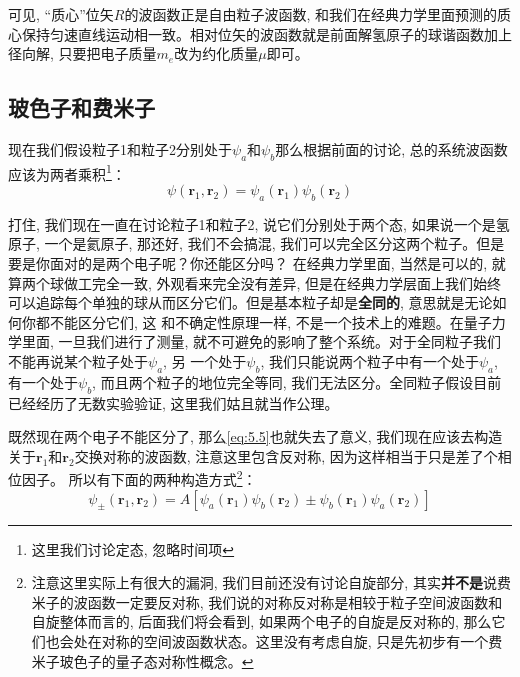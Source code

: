 可见, “质心”位矢$R$的波函数正是自由粒子波函数, 和我们在经典力学里面预测的质心保持匀速直线运动相一致。相对位矢的波函数就是前面解氢原子的球谐函数加上径向解, 只要把电子质量$m_e$改为约化质量$\mu$即可。
\subsection{玻色子和费米子}
现在我们假设粒子1和粒子2分别处于$\psi_a$和$\psi_b$那么根据前面的讨论, 总的系统波函数应该为两者乘积\footnote{这里我们讨论定态, 忽略时间项}：
\begin{equation}
    \label{eq:5.5}
    \psi(\mathbf{r}_1,\mathbf{r}_2)=\psi_a(\mathbf{r}_1)\psi_b(\mathbf{r}_2)
\end{equation}  

打住, 我们现在一直在讨论粒子1和粒子2, 说它们分别处于两个态, 如果说一个是氢原子, 一个是氦原子, 那还好, 我们不会搞混, 我们可以完全区分这两个粒子。但是要是你面对的是两个电子呢？你还能区分吗？
在经典力学里面, 当然是可以的, 就算两个球做工完全一致, 外观看来完全没有差异, 但是在经典力学层面上我们始终可以追踪每个单独的球从而区分它们。但是基本粒子却是\textbf{全同的}, 意思就是无论如何你都不能区分它们, 这
和不确定性原理一样, 不是一个技术上的难题。在量子力学里面, 一旦我们进行了测量, 就不可避免的影响了整个系统。对于全同粒子我们不能再说某个粒子处于$\psi_a$, 另
一个处于$\psi_b$, 我们只能说两个粒子中有一个处于$\psi_a$, 有一个处于$\psi_b$, 而且两个粒子的地位完全等同, 我们无法区分。全同粒子假设目前已经经历了无数实验验证, 这里我们姑且就当作公理。

既然现在两个电子不能区分了, 那么\ref{eq:5.5}也就失去了意义, 我们现在应该去构造关于$\mathbf{r}_1$和$\mathbf{r}_2$交换对称的波函数, 注意这里包含反对称, 因为这样相当于只是差了个相位因子。
所以有下面的两种构造方式\footnote{注意这里实际上有很大的漏洞, 我们目前还没有讨论自旋部分, 其实\textbf{并不是}说费米子的波函数一定要反对称, 我们说的对称反对称是相较于粒子空间波函数和自旋整体而言的, 后面我们将会看到, 如果两个电子的自旋是反对称的, 那么它们也会处在对称的空间波函数状态。这里没有考虑自旋, 只是先初步有一个费米子玻色子的量子态对称性概念。}：
\begin{equation}
    \label{eq:5.6}
    \psi_\pm(\mathbf{r}_1,\mathbf{r}_2)=A\left[\psi_a(\mathbf{r}_1)\psi_b(\mathbf{r}_2)\pm\psi_b(\mathbf{r}_1)\psi_a(\mathbf{r}_2)\right]
\end{equation}

